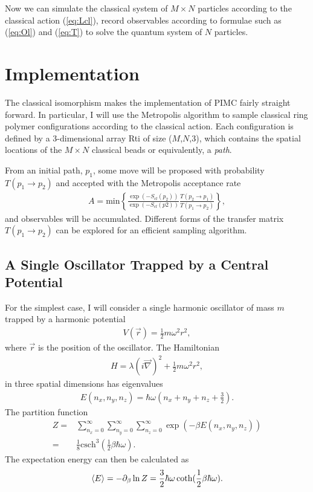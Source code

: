 \documentclass[prl,reprint]{revtex4-1}
\begin{document}
Now we can simulate the classical system of $M\times N$ particles according to the classical action (\ref{eq:Lcl}), record observables according to formulae such as (\ref{eq:Ol}) and (\ref{eq:T}) to solve the quantum system of $N$ particles.

\section{Implementation}

The classical isomorphism makes the implementation of PIMC fairly straight forward. In particular, I will use the Metropolis algorithm to sample classical ring polymer configurations according to the classical action. Each configuration is defined by a 3-dimensional array Rti of size ($M$,$N$,$3$), which contains the spatial locations of the $M\times N$ classical beads or equivalently, a \emph{path}.

From an initial path, $p_1$, some move will be proposed with probability $T(p_1\rightarrow p_2)$ and accepted with the Metropolis acceptance rate 
\begin{align}
A = \text{min}\left\{\frac{\exp(-S_{cl}(p_2))}{\exp(-S_{cl}(p2))}\frac{T(p_2\rightarrow p_1)}{T(p_1\rightarrow p_2)}\right\},
\end{align}
and observables will be accumulated. Different forms of the transfer matrix $T(p_1\rightarrow p_2)$ can be explored for an efficient sampling algorithm.

\subsection{A Single Oscillator Trapped by a Central Potential}
For the simplest case, I will consider a single harmonic oscillator of mass $m$ trapped by a harmonic potential~\cite{QMC_book}
\begin{align}
V(\vec{r}) = \frac{1}{2}m\omega^2r^2,
\end{align}
where $\vec{r}$ is the position of the oscillator. The Hamiltonian
\begin{align}
H=\lambda (i\vec{\nabla})^2+\frac{1}{2}m\omega^2r^2,
\end{align}
in three spatial dimensions has eigenvalues
\begin{align}
E(n_x,n_y,n_z) = \hbar\omega(n_x+n_y+n_z+\frac{3}{2}).
\end{align}
The partition function
\begin{align}
Z =& \sum_{n_x=0}^\infty\sum_{n_y=0}^\infty\sum_{n_z=0}^\infty \exp\left(-\beta E(n_x,n_y,n_z)\right) \nonumber \\
=&\frac{1}{8}\text{csch}^3(\frac{1}{2}\beta\hbar\omega).
\end{align}
The expectation energy can then be calculated as
\begin{align}
\braket{E} = -\partial_\beta\ln Z=\frac{3}{2}\hbar\omega\coth(\frac{1}{2}\beta\hbar\omega).
\end{align}
\end{document}
